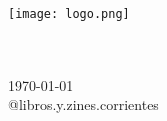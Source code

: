 

\begin{center}
    \thispagestyle{empty}     %
    \addtocounter{page}{-1}   %
    
    \vspace*{\fill} 
    \texttt{[image: logo.png]}
    
    \scriptsize{
        \theauthor \\
        \theoriginaltitle \\
        \today \\
        \vspace{0.25in}
        @libros.y.zines.corrientes \\
    }
    
\end{center}